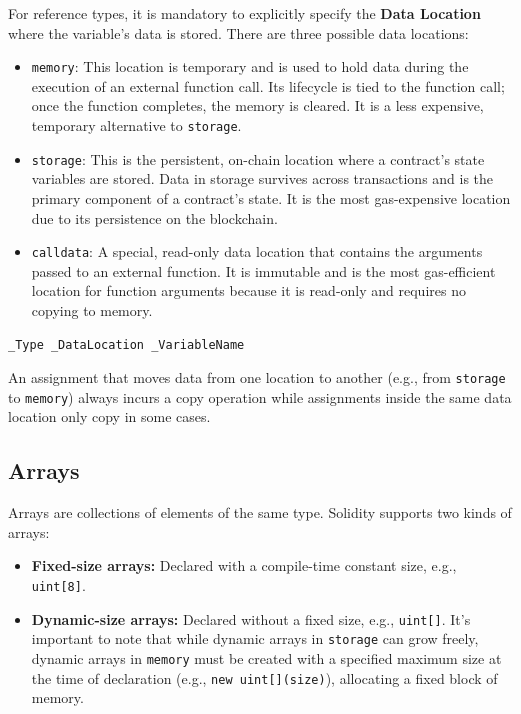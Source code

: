 \documentclass{scrbook}
\begin{document}
For reference types, it is mandatory to explicitly specify the \textbf{Data Location} where the variable's data is stored. There are three possible data locations:

\begin{itemize}
    \item \texttt{memory}: This location is temporary and is used to hold data during the execution of an external function call. Its lifecycle is tied to the function call; once the function completes, the memory is cleared. It is a less expensive, temporary alternative to \texttt{storage}.
    
    \item \texttt{storage}: This is the persistent, on-chain location where a contract's state variables are stored. Data in storage survives across transactions and is the primary component of a contract's state. It is the most gas-expensive location due to its persistence on the blockchain.
    
    \item \texttt{calldata}: A special, read-only data location that contains the arguments passed to an external function. It is immutable and is the most gas-efficient location for function arguments because it is read-only and requires no copying to memory.
\end{itemize}

\begin{lstlisting}[caption={Reference variable declaration syntax}]
    _Type _DataLocation _VariableName
\end{lstlisting}

An assignment that moves data from one location to another (e.g., from \texttt{storage} to \texttt{memory}) always incurs a copy operation while assignments inside the same data location only copy in some cases.

\subsection{Arrays}

Arrays are collections of elements of the same type. Solidity supports two kinds of arrays:

\begin{itemize}
    \item \textbf{Fixed-size arrays:} Declared with a compile-time constant size, e.g., \texttt{uint[8]}.
    
    \item \textbf{Dynamic-size arrays:} Declared without a fixed size, e.g., \texttt{uint[]}. It's important to note that while dynamic arrays in \texttt{storage} can grow freely, dynamic arrays in \texttt{memory} must be created with a specified maximum size at the time of declaration (e.g., \texttt{new uint[](size)}), allocating a fixed block of memory.
\end{itemize}
\end{document}
